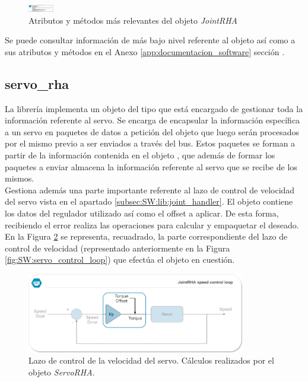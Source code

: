         \begin{figure}[H]
            \centering
            \includegraphics[width=0.100\textwidth]{figuras/Imagenes_SW/class_diagram_JRHA.jpg}
            \caption{Atributos y métodos más relevantes del objeto \textit{JointRHA}}
            \label{fig:SW:class_diagram_JRHA}
        \end{figure}

        Se puede consultar información de más bajo nivel referente al objeto  así como a sus atributos y métodos en el Anexo \ref{app:documentacion_software} sección \completar.

    \subsection{servo\_rha} \label{subsec:SW:lib:servo_rha}
        La librería  implementa un objeto del tipo  que está encargado de gestionar toda la información referente al servo. Se encarga de encapsular la información específica a un servo en paquetes de datos a petición del objeto  que luego serán procesados por el mismo previo a ser enviados a través del bus. Estos paquetes se forman a partir de la información contenida en el objeto , que además de formar los paquetes a enviar almacena la información referente al servo que se recibe de los mismos.
        \\

        Gestiona además una parte importante referente al lazo de control de velocidad del servo vista en el apartado \ref{subsec:SW:lib:joint_handler}. El objeto  contiene los datos del regulador utilizado así como el offset a aplicar. De esta forma, recibiendo el error realiza las operaciones para calcular y empaquetar el  deseado. En la Figura \ref{fig:SW:servo_control_loop_servo_part} se representa, recuadrado, la parte correspondiente del lazo de control de velocidad (representado anteriormente en la Figura \ref{fig:SW:servo_control_loop}) que efectúa el objeto en cuestión.
        \begin{figure}[H]
        \centering
        \includegraphics[width=0.85\textwidth]{figuras/Imagenes_SW/servo_control_loop_servo_part.png}
        \caption{Lazo de control de la velocidad del servo. Cálculos realizados por el objeto \textit{ServoRHA}.}
        \label{fig:SW:servo_control_loop_servo_part}
        \end{figure}

